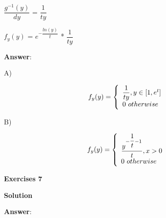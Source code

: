 \documentclass[12pt]{article}
\theoremstyle{definiton}
\theoremstyle{definition}
\theoremstyle{definition}
\begin{document}
$\dfrac{g^{-1}(y)}{dy}$ = $\dfrac{1}{ty}$
\medskip

$f_y(y)$ = $e^{-\dfrac{ln(y)}{t}}$ * $\dfrac{1}{ty}$
\medskip


		\medskip
		\textbf{Answer}:

A)
\medskip

\[f_y(y) = \left\{
\begin{array}{l l}
  \dfrac{1}{ty}, y \in [1, e^t]\\
  0\ otherwise
\end{array} \right.\]

B)
\medskip

\[f_y(y) = \left\{
\begin{array}{l l}
  \dfrac{y^{-\dfrac{1}{t}-1}}{t}, x > 0\\
  0\ otherwise
\end{array} \right.\]
		
		\bigskip
		
		\textbf{Exercises 7}
		
		\medskip
		
		\textbf{Solution}
		

		\medskip
		\textbf{Answer}:
\end{document}
